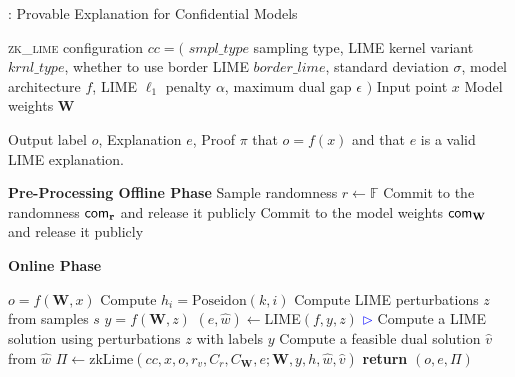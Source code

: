 
\vspace{5cm}
\begin{algorithm}[htbp]
\begin{algorithmic}[1]
   \caption{\name: Provable Explanation for Confidential Models}
   \label{alg:ExpProof}
    
     \textsc{zk\_lime} configuration $cc = ($ $smpl\_type$ sampling type, LIME kernel variant $krnl\_type$, whether to use border LIME $border\_lime$, standard deviation $\sigma$, model architecture $f$, LIME $\ell_1$ penalty $\alpha$, maximum dual gap $\epsilon$ $)$
     Input point $x$
     Model weights $\mathbf{W}$

     Output label $o$, Explanation $e$, Proof $\pi$ that $o = f(x)$ and that $e$ is a valid LIME explanation.

    \STATE \textbf{Pre-Processing Offline Phase}
    \STATE Sample randomness $r \leftarrow \mathbb{F}$
    \STATE Commit to the randomness $\textsf{com}_{\mathbf{r}}$ and release it publicly
    \STATE Commit to the model weights $\textsf{com}_{\mathbf{W}}$ and release it publicly 

    \STATE \textbf{Online Phase}

    \STATE $o = f(\mathbf{W}, x)$
    \STATE Compute $h_i = \text{Poseidon}(k, i)$
    \STATE Compute LIME perturbations $z$ from samples $s$
    \STATE $y = f(\mathbf{W}, z)$
    \STATE $(e, \hat{w}) \leftarrow $LIME$(f, y, z)$ \hfill\textcolor{blue}{$\rhd$} Compute a LIME solution using perturbations $z$ with labels $y$
    \STATE Compute a feasible dual solution $\hat{v}$ from $\hat{w}$
    \STATE $\Pi \leftarrow $zkLime$(cc, x, o, r_v, C_r, C_\mathbf{W}, e; \mathbf{W}, y, h, \hat{w}, \hat{v})$
    \STATE \textbf{return} $(o, e, \Pi)$
\end{algorithmic}
\end{algorithm}
\clearpage
%
%    
%
%
%
